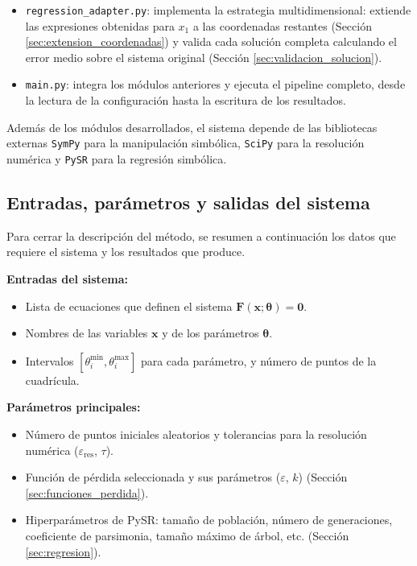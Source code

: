\documentclass{article} \usepackage[utf8]{inputenc} \usepackage[spanish]{babel} \usepackage{amsmath, amssymb, amsthm} \usepackage{bm} \usepackage{float} \usepackage{longtable} \usepackage[hidelinks]{hyperref}
\newcommand{\xvec}{\mathbf{x}} \newcommand{\thetavec}{\boldsymbol{\theta}} \newcommand{\Fvec}{\mathbf{F}} \newcommand{\R}{\mathbb{R}} \newcommand{\norm}[1]{\left\lVert#1\right\rVert} \newcommand{\loss}{\mathcal{L}} \newcommand{\dataset}{\mathcal{D}} \newcommand{\jac}{\mathbf{J}}
\begin{document}
\begin{itemize}
    \item \texttt{regression\_adapter.py}: implementa la estrategia multidimensional: extiende las expresiones obtenidas para \(x_1\) a las coordenadas restantes (Sección \ref{sec:extension_coordenadas}) y valida cada solución completa calculando el error medio sobre el sistema original (Sección \ref{sec:validacion_solucion}).

    \item \texttt{main.py}: integra los módulos anteriores y ejecuta el pipeline completo, desde la lectura de la configuración hasta la escritura de los resultados. \end{itemize}

Además de los módulos desarrollados, el sistema depende de las bibliotecas externas \texttt{SymPy} para la manipulación simbólica, \texttt{SciPy} para la resolución numérica y \texttt{PySR} para la regresión simbólica.

\subsection{Entradas, parámetros y salidas del sistema} \label{sec:entradas_salidas_anexo}

Para cerrar la descripción del método, se resumen a continuación los datos que requiere el sistema y los resultados que produce.

\textbf{Entradas del sistema:} \begin{itemize} \item Lista de ecuaciones que definen el sistema \(\Fvec(\xvec; \thetavec) = \mathbf{0}\). \item Nombres de las variables \(\xvec\) y de los parámetros \(\thetavec\). \item Intervalos \([\theta_i^{\min}, \theta_i^{\max}]\) para cada parámetro, y número de puntos de la cuadrícula. \end{itemize}

\textbf{Parámetros principales:} \begin{itemize} \item Número de puntos iniciales aleatorios y tolerancias para la resolución numérica (\(\varepsilon_{\text{res}}\), \(\tau\)). \item Función de pérdida seleccionada y sus parámetros (\(\varepsilon\), \(k\)) (Sección \ref{sec:funciones_perdida}). \item Hiperparámetros de PySR: tamaño de población, número de generaciones, coeficiente de parsimonia, tamaño máximo de árbol, etc. (Sección \ref{sec:regresion}). \end{itemize}
\end{document}
